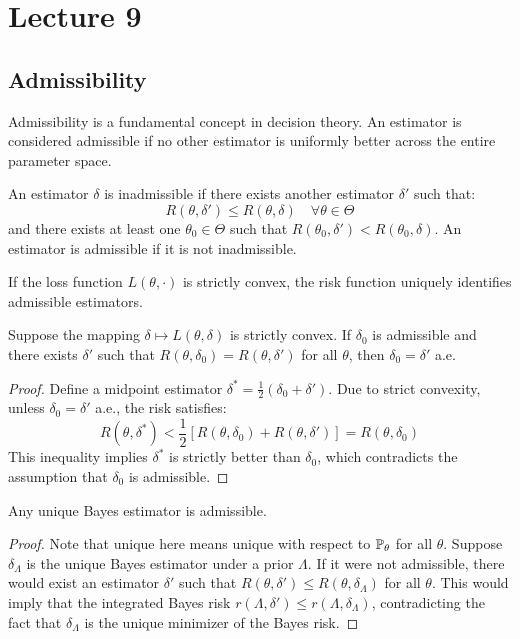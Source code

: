 \newpage
\section{Lecture 9}

\subsection{Admissibility} 
Admissibility is a fundamental concept in decision theory. An estimator is considered admissible if no other estimator is uniformly better across the entire parameter space.

\begin{definition}
	An estimator $\delta$ is inadmissible if there exists another estimator $\delta'$ such that:
	$$R(\theta, \delta') \le R(\theta, \delta) \quad \forall \theta \in \Theta$$
	and there exists at least one $\theta_0 \in \Theta$ such that $R(\theta_0, \delta') < R(\theta_0, \delta)$.
	An estimator is admissible if it is not inadmissible.
\end{definition}

\noindent If the loss function $L(\theta, \cdot)$ is strictly convex, the risk function uniquely identifies admissible estimators.

\begin{theorem}
	Suppose the mapping $\delta \mapsto L(\theta, \delta)$ is strictly convex. If $\delta_0$ is admissible and there exists $\delta'$ such that $R(\theta, \delta_0) = R(\theta, \delta')$ for all $\theta$, then $\delta_0 = \delta'$ a.e.
\end{theorem}

\begin{proof}
	Define a midpoint estimator $\delta^* = \frac{1}{2}(\delta_0 + \delta')$. Due to strict convexity, unless $\delta_0 = \delta'$ a.e., the risk satisfies:
	$$R(\theta, \delta^*) < \frac{1}{2}[R(\theta, \delta_0) + R(\theta, \delta')] = R(\theta, \delta_0)$$
	This inequality implies $\delta^*$ is strictly better than $\delta_0$, which contradicts the assumption that $\delta_0$ is admissible.
\end{proof}

\begin{lemma}
	Any unique Bayes estimator is admissible.
\end{lemma}

\begin{proof}
		Note that unique here means unique with respect to $\mathbb{P}_\theta$ for all $\theta$. Suppose $\delta_\Lambda$ is the unique Bayes estimator under a prior $\Lambda$. If it were not admissible, there would exist an estimator $\delta'$ such that $R(\theta, \delta') \le R(\theta, \delta_\Lambda)$ for all $\theta$. This would imply that the integrated Bayes risk $r(\Lambda, \delta') \le r(\Lambda, \delta_\Lambda)$, contradicting the fact that $\delta_\Lambda$ is the unique minimizer of the Bayes risk.
\end{proof}

